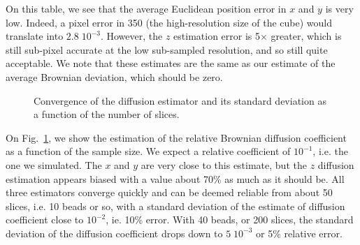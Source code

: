 \documentclass{llncs}
\begin{document}
On this table, we see that the average Euclidean position error in $x$ and $y$ is very low. Indeed, a pixel error in 350 (the high-resolution size of the cube) would translate into $2.8\;10^{-3}$. However, the $z$ estimation error is 5$\times$ greater, which is still sub-pixel accurate at the low sub-sampled resolution, and so still quite acceptable. We note that these estimates are the same as our estimate of the average Brownian deviation, which should be zero.

\begin{figure}
\centering
{}
\caption{Convergence of the diffusion estimator and its standard deviation as a function of the number of slices.}
\label{fig:estim}
\end{figure}

On Fig.~\ref{fig:estim}, we show the estimation of the relative Brownian diffusion coefficient as a function of the sample size. We expect a relative
coefficient of $10^{-1}$, i.e. the one we simulated. The $x$ and $y$ are very close to this estimate, but the $z$ diffusion estimation appears biased with a value about 70\% as much as it should be. All three estimators converge quickly and can be deemed reliable from about 50 slices, i.e. 10 beads or so, with a standard deviation of the estimate of diffusion coefficient close to $10^{-2}$, ie. 10\% error. With 40 beads, or 200 slices, the standard deviation of the diffusion coefficient drops down to $5\;10^{-3}$ or 5\% relative error.
\end{document}
